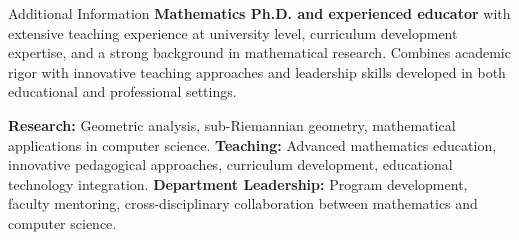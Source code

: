 \begin{rubric}{Additional Information}
\entry*[2012-Present] \textbf{Mathematics Ph.D. and experienced educator} with extensive teaching experience at university level, curriculum development expertise, and a strong background in mathematical research. Combines academic rigor with innovative teaching approaches and leadership skills developed in both educational and professional settings.

\entry*[] \textbf{Research:} Geometric analysis, sub-Riemannian geometry, mathematical applications in computer science.
\entry*[] \textbf{Teaching:} Advanced mathematics education, innovative pedagogical approaches, curriculum development, educational technology integration.
\entry*[] \textbf{Department Leadership:} Program development, faculty mentoring, cross-disciplinary collaboration between mathematics and computer science.

\end{rubric}
